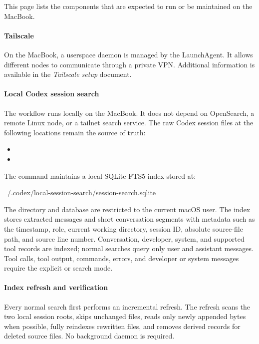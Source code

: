 

This page lists the components that are expected to run or be maintained on the MacBook.

\paragraph{Tailscale}
On the MacBook, a userspace  daemon is managed by the  LaunchAgent.
It allows different nodes to communicate through a private VPN.
Additional information is available in the \emph{Tailscale setup} document.

\paragraph{Local Codex session search}
The  workflow runs locally on the MacBook.
It does not depend on OpenSearch, a remote Linux node, or a tailnet search service.
The raw Codex session files at the following locations remain the source of truth:
\begin{itemize}
    \item {}
    \item {}
\end{itemize}

The  command maintains a local SQLite FTS5 index stored at:
\begin{DocCode}
~/.codex/local-session-search/session-search.sqlite
\end{DocCode}
The directory and database are restricted to the current macOS user.
The index stores extracted messages and short conversation segments with metadata such as the timestamp, role, current working directory, session ID, absolute source-file path, and source line number.
Conversation, developer, system, and supported tool records are indexed; normal searches query only user and assistant messages.
Tool calls, tool output, commands, errors, and developer or system messages require the explicit  or  search mode.

\paragraph{Index refresh and verification}
Every normal search first performs an incremental refresh.
The refresh scans the two local session roots, skips unchanged  files, reads only newly appended bytes when possible, fully reindexes rewritten files, and removes derived records for deleted source files.
No background daemon is required.

